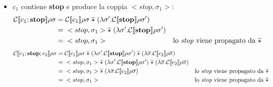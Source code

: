 \begin{itemize}
        \item $c_1$ contiene \textbf{stop} e produce la coppia $<stop, \sigma_1>$:
            \begin{align*}
                \mathcal{C}\llbracket c_1;\mbox{\textbf{stop}} \rrbracket\rho\sigma =\;& \mathcal{C}\llbracket c_1 \rrbracket\rho\sigma\; \overline{\star}\; (\lambda\sigma'.\mathcal{C}\llbracket \mbox{\textbf{stop}} \rrbracket\rho\sigma')\\
                =\;& <stop, \sigma_1> \overline{\star}\; (\lambda\sigma'.\mathcal{C}\llbracket \mbox{\textbf{stop}} \rrbracket\rho\sigma')\\
                =\;& <stop,\sigma_1> &\mbox{lo \textit{stop} viene propagato da $\overline{\star}$}
            \end{align*}
            \begin{align*}
                \mathcal{C}\llbracket c_1;\mbox{\textbf{stop}};c_2 \rrbracket\rho\sigma =\;& \mathcal{C}\llbracket c_1 \rrbracket\rho\sigma\; \overline{\star}\; (\lambda\sigma'.\mathcal{C}\llbracket \mbox{\textbf{stop}} \rrbracket\rho\sigma')\; \overline{\star}\; (\lambda\overline{\sigma}.\mathcal{C}\llbracket c_2 \rrbracket\rho\overline{\sigma})\\
                =\;& <stop,\sigma_1> \overline{\star}\; (\lambda\sigma'.\mathcal{C}\llbracket \mbox{\textbf{stop}} \rrbracket\rho\sigma')\; \overline{\star}\; (\lambda\overline{\sigma}.\mathcal{C}\llbracket c_2 \rrbracket\rho\overline{\sigma})\\
                =\;& <stop,\sigma_1> \overline{\star}\; (\lambda\overline{\sigma}.\mathcal{C}\llbracket c_2 \rrbracket\rho\overline{\sigma}) &\mbox{lo \textit{stop} viene propagato da $\overline{\star}$}\\
                =\;& <stop,\sigma_1> &\mbox{lo \textit{stop} viene propagato da $\overline{\star}$}
            \end{align*}
            

\end{itemize}
